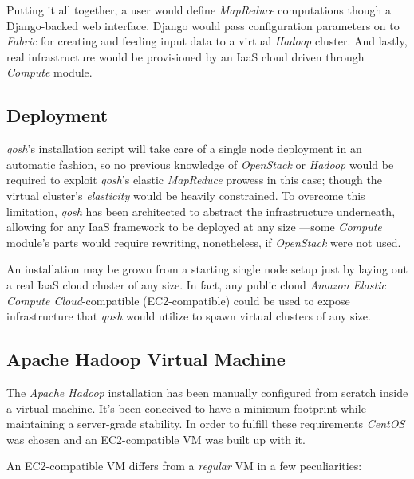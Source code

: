 \documentclass{sig-alternate}
\begin{document}
Putting it all together, a user would define \emph{MapReduce} computations though a Django-backed web interface. Django would pass configuration parameters on to \emph{Fabric} for creating and feeding input data to a virtual \emph{Hadoop} cluster. And lastly, real infrastructure would be provisioned by an IaaS cloud driven through \emph{Compute} module.


\subsection{Deployment}
\noindent \emph{qosh}'s installation script will take care of a single node deployment in an automatic fashion, so no previous knowledge of \emph{OpenStack} or \emph{Hadoop} would be required to exploit \emph{qosh}'s elastic \emph{MapReduce} prowess in this case; though the virtual cluster's \emph{elasticity} would be heavily constrained. To overcome this limitation, \emph{qosh} has been architected to abstract the infrastructure underneath, allowing for any IaaS framework to be deployed at any size ---some \emph{Compute} module's parts would require rewriting, nonetheless, if \emph{OpenStack} were not used.

An installation may be grown from a starting single node setup just by laying out a real IaaS cloud cluster of any size. In fact, any public cloud \emph{Amazon Elastic Compute Cloud}-compatible (EC2-compatible) could be used to expose infrastructure that \emph{qosh} would utilize to spawn virtual clusters of any size.


\subsection{Apache Hadoop Virtual Machine}\label{subsec:hadvm}
\noindent The \emph{Apache Hadoop} installation has been manually configured from scratch inside a virtual machine. It's been conceived to have a minimum footprint while maintaining a server-grade stability. In order to fulfill these requirements \emph{CentOS} was chosen and an EC2-compatible VM was built up with it.

An EC2-compatible VM differs from a \emph{regular} VM in a few peculiarities:
\end{document}
